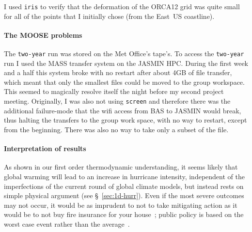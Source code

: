 I used \texttt{iris} to verify that the deformation of the ORCA12 grid was quite small
for all of the points that I initially chose (from the East~US coastline).

\paragraph{The MOOSE problems}

The \texttt{two-year} run was stored on the
Met Office's tape's.
To access the \texttt{two-year} run I used the
MASS transfer system on the JASMIN HPC.
During the first week and a half this system broke
with no restart after about 4GB of file transfer,
which meant that only the smallest files could be
moved to the group workspace. This seemed to magically resolve
itself the night before my second project meeting.
Originally, I was also not using \texttt{screen}
and therefore there was the additional failure-mode
that the wifi access from BAS to JASMIN would break,
thus halting the transfers to the group work space,
with no way to restart, except from the beginning.
There was also no way to take only a subset of the file.

\paragraph{Interpretation of results}
As shown in our first order thermodynamic understanding, it seems likely that
global warming will lead to an increase in hurricane intensity, independent
of the imperfections of the current round of global climate models,
but instead rests on simple physical argument (see §~\ref{sec:1d-hurr}).
Even if the most severe outcomes may not occur,
it would be as imprudent to not to take mitigating action as it would be
to not buy fire insurance for your house~\cite{emanuel2005divine};
public policy is based on the worst case event rather than the average~\cite{taleb2020statistical}.
